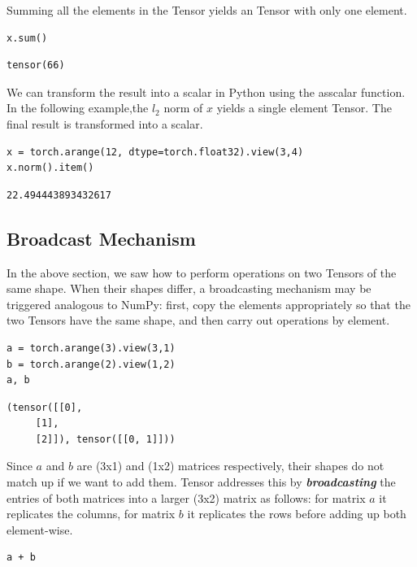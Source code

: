 \documentclass[]{article}
\begin{document}
Summing all the elements in the Tensor yields an Tensor with only one element.

\begin{verbatim}
x.sum()
\end{verbatim}

\begin{verbatim}
tensor(66)
\end{verbatim}

We can transform the result into a scalar in Python using  the asscalar function. In the following example,the $ l_2 $ norm of $ x $ yields a single element Tensor. The final result is transformed into a scalar.

\begin{verbatim}
x = torch.arange(12, dtype=torch.float32).view(3,4)
x.norm().item()
\end{verbatim}

\begin{verbatim}
22.494443893432617
\end{verbatim}

\subsection{Broadcast Mechanism}

In the above section, we saw how to perform operations on two Tensors of the same shape. When their shapes differ, a broadcasting mechanism may be triggered analogous to NumPy: first, copy the elements appropriately so that the two Tensors have the same shape, and then carry out operations by element.

\begin{verbatim}
a = torch.arange(3).view(3,1)
b = torch.arange(2).view(1,2)
a, b
\end{verbatim}

\begin{verbatim}
(tensor([[0],
	 [1],
	 [2]]), tensor([[0, 1]]))
\end{verbatim}

Since $ a $ and $ b $ are (3x1) and (1x2) matrices respectively, their shapes do not match up if we want to add them. Tensor addresses this by \textbf{\textit{broadcasting}} the entries of both matrices into a larger (3x2) matrix as follows: for matrix $ a $ it replicates the columns, for matrix $ b $ it replicates the rows before adding up both element-wise.

\begin{verbatim}
a + b
\end{verbatim}
\end{document}
